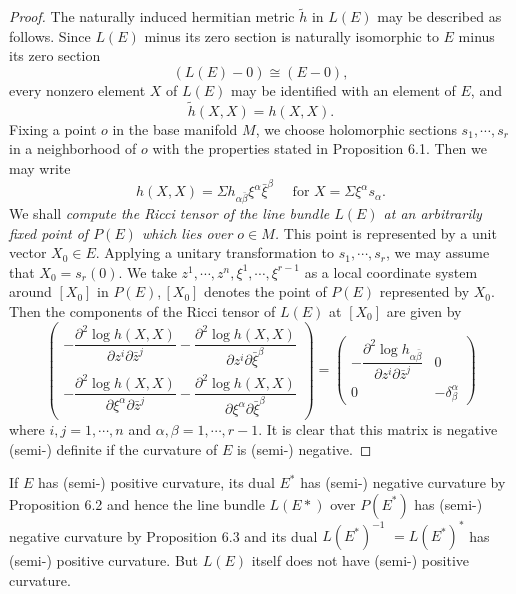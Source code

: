 \documentclass[lang=en,12pt]{beautybook}
\begin{document}
\begin{proof}
The naturally induced hermitian metric $\tilde{h}$ in $L(E)$ may be described as follows. Since $L(E)$ minus its zero section is naturally isomorphic to $E$ minus its zero section
\[(L(E)-0)\cong (E-0),\]
every nonzero element $X$ of $L(E)$ may be identified with an element of $E$, and
\begin{equation*}
\tilde{h}(X, X)=h(X, X) .
\end{equation*}
Fixing a point $o$ in the base manifold $M$, we choose holomorphic sections $s_1, \cdots, s_r$ in a neighborhood of $o$ with the properties stated in Proposition 6.1. Then we may write
\begin{equation*}
h(X, X)=\Sigma h_{\alpha \bar{\beta}} \xi^\alpha \bar{\xi}^\beta \quad \text { for } X=\Sigma \xi^\alpha s_\alpha .
\end{equation*}
We shall \textit{compute the Ricci tensor of the line bundle $L(E)$ at an arbitrarily fixed point of $P(E)$ which lies over $o \in M$.} This point is represented by a unit vector $X_0 \in E$. Applying a unitary transformation to $s_1, \cdots, s_r$, we may assume that $X_0=s_r(0)$. We take $z^1, \cdots, z^n, \xi^1, \cdots, \xi^{r-1}$ as a local coordinate system around $\left[X_0\right]$ in $P(E),\left[X_0\right]$ denotes the point of $P(E)$ represented by $X_0$. Then the components of the Ricci tensor of $L(E)$ at $\left[X_0\right]$ are given by
\begin{equation*}
\left(\begin{array}{l}
-\dfrac{\partial^2 \log h(X, X)}{\partial z^i \partial \bar{z}^j}-\dfrac{\partial^2 \log h(X, X)}{\partial z^i \partial \bar{\xi}^\beta} \\[1mm]
-\dfrac{\partial^2 \log h(X, X)}{\partial \xi^\alpha \partial \bar{z}^j}-\dfrac{\partial^2 \log h(X, X)}{\partial \xi^\alpha \partial \bar{\xi}^\beta}
\end{array}\right)=\left(\begin{array}{cr}
-\dfrac{\partial^2 \log h_{\alpha \bar{\beta}}}{\partial z^i \partial \bar{z}^j} & 0 \\[1mm]
0 & -\delta_\beta^\alpha
\end{array}\right)
\end{equation*}
where $i, j=1, \cdots, n$ and $\alpha, \beta=1, \cdots, r-1$. It is clear that this matrix is negative (semi-) definite if the curvature of $E$ is (semi-) negative. 
\end{proof}
\begin{remark}
  If $E$ has (semi-) positive curvature, its dual $E^*$ has (semi-) negative curvature by Proposition 6.2 and hence the line bundle $L(E *)$ over $P\left(E^*\right)$ has (semi-) negative curvature by Proposition 6.3 and its dual $L\left(E^*\right)^{-1}$ $=L\left(E^*\right)^*$ has (semi-) positive curvature. But $L(E)$ itself does not have (semi-) positive curvature.
\end{remark}
\end{document}
